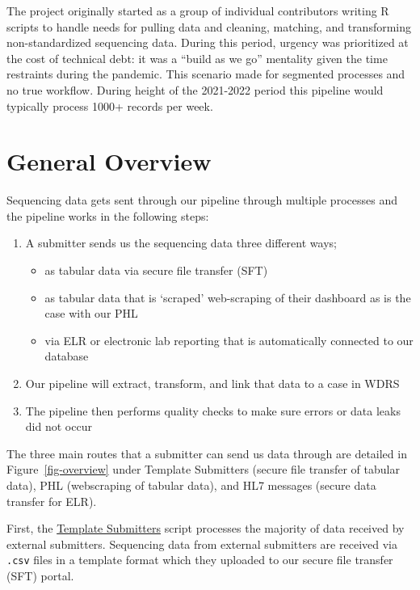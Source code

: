 \documentclass[
]{agujournal2019}
\providecommand{\tightlist}{%
  \setlength{\itemsep}{0pt}\setlength{\parskip}{0pt}}\usepackage{longtable,booktabs,array}
\begin{document}
The project originally started as a group of individual contributors
writing R scripts to handle needs for pulling data and cleaning,
matching, and transforming non-standardized sequencing data\hspace{0pt}.
During this period, urgency was prioritized at the cost of technical
debt: it was a ``build as we go''\hspace{0pt} mentality given the time
restraints during the pandemic. This scenario made for segmented
processes and no true workflow. During height of the 2021-2022 period
this pipeline would typically process 1000+ records per
week\hspace{0pt}.

\section{General Overview}\label{sec-overview}

Sequencing data gets sent through our pipeline through multiple
processes and the pipeline works in the following steps:

\begin{enumerate}
\def\labelenumi{\arabic{enumi}.}
\tightlist
\item
  A submitter sends us the sequencing data three different ways;

  \begin{itemize}
  \tightlist
  \item
    as tabular data via secure file transfer (SFT)
  \item
    as tabular data that is `scraped' web-scraping of their dashboard as
    is the case with our PHL
  \item
    via ELR or electronic lab reporting that is automatically connected
    to our database
  \end{itemize}
\item
  Our pipeline will extract, transform, and link that data to a case in
  WDRS
\item
  The pipeline then performs quality checks to make sure errors or data
  leaks did not occur
\end{enumerate}

The three main routes that a submitter can send us data through are
detailed in Figure~\ref{fig-overview} under Template Submitters (secure
file transfer of tabular data), PHL (webscraping of tabular data), and
HL7 messages (secure data transfer for ELR).

First, the \href{@sec-template}{Template Submitters} script processes
the majority of data received by external submitters. Sequencing data
from external submitters are received via \texttt{.csv} files in a
template format which they uploaded to our secure file transfer (SFT)
portal.
\end{document}
